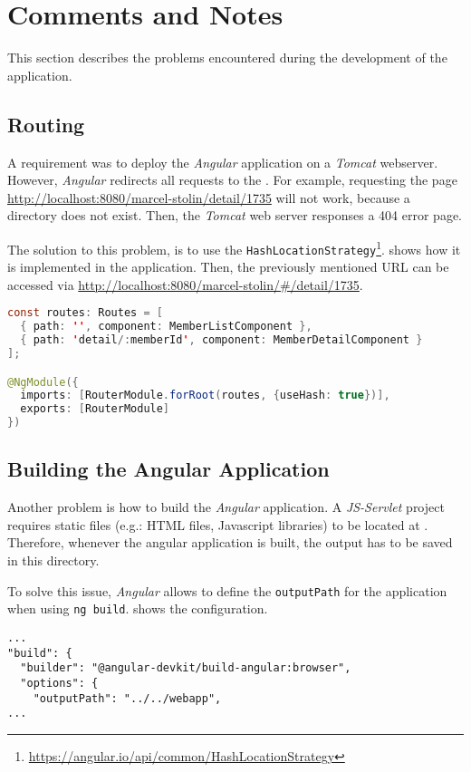 \section{Comments and Notes}\label{sec:04_comments}
This section describes the problems encountered during the development of the application.


\subsection{Routing}\label{subsec:04_comments_routing}
A requirement was to deploy the \textit{Angular} application on a \textit{Tomcat} webserver. However, \textit{Angular} redirects all requests to the .
For example, requesting the page \url{http://localhost:8080/marcel-stolin/detail/1735} will not work, because a directory  does not exist. Then, the \textit{Tomcat} web server responses a 404 error page.

The solution to this problem, is to use the \texttt{HashLocationStrategy}\footnote{\url{https://angular.io/api/common/HashLocationStrategy}}.  shows how it is implemented in the application.
Then, the previously mentioned URL can be accessed via \url{http://localhost:8080/marcel-stolin/#/detail/1735}.
\begin{lstlisting}[label=lst:04_comments_routing_hashrouting, caption=Application routing configuration of \texttt{app-routing.module.ts}, language=java]
const routes: Routes = [
  { path: '', component: MemberListComponent },
  { path: 'detail/:memberId', component: MemberDetailComponent }
];

@NgModule({
  imports: [RouterModule.forRoot(routes, {useHash: true})],
  exports: [RouterModule]
})
\end{lstlisting}


\subsection{Building the Angular Application}\label{subsec:04_comments_building}
Another problem is how to build the \textit{Angular} application.
A \textit{JS-Servlet} project requires static files (e.g.: HTML files, Javascript libraries) to be located at .
Therefore, whenever the angular application is built, the output has to be saved in this directory.

To solve this issue, \textit{Angular} allows to define the \texttt{outputPath} for the application when using \texttt{ng build}.  shows the  configuration.
\begin{lstlisting}[label=lst:04_comments_building_config, caption=\texttt{angular.json} configuration]
...
"build": {
  "builder": "@angular-devkit/build-angular:browser",
  "options": {
    "outputPath": "../../webapp",
...
\end{lstlisting}


